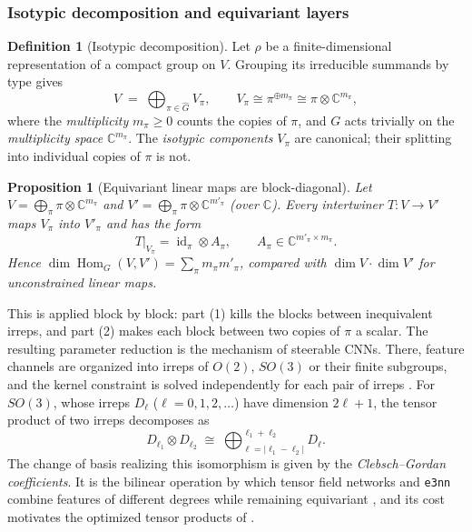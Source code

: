 \documentclass[11pt]{article}
\theoremstyle{plain}
\newtheorem{Proposition}{Proposition}[section]
\theoremstyle{definition}
\newtheorem{Definition}{Definition}[section]
\begin{document}
\subsubsection{Isotypic decomposition and equivariant layers}
\label{sec:isotypic-decomposition}

\begin{Definition}[Isotypic decomposition]\label{def:isotypic-decomposition}
Let $\rho$ be a finite-dimensional representation of a compact group on $V$.
Grouping its irreducible summands by type gives
\[
    V \;=\; \bigoplus_{\pi\in\widehat{G}} V_\pi, \qquad V_\pi\cong\pi^{\oplus m_\pi}\cong\pi\otimes\mathbb{C}^{m_\pi},
\]
where the \emph{multiplicity} $m_\pi\geq 0$ counts the copies of $\pi$, and $G$ acts trivially on the \emph{multiplicity space} $\mathbb{C}^{m_\pi}$.
The \emph{isotypic components} $V_\pi$ are canonical; their splitting into individual copies of $\pi$ is not.
\end{Definition}

\begin{Proposition}[Equivariant linear maps are block-diagonal]\label{prop:schur-blocks}
Let $V = \bigoplus_\pi\pi\otimes\mathbb{C}^{m_\pi}$ and $V' = \bigoplus_\pi\pi\otimes\mathbb{C}^{m'_\pi}$ (over $\mathbb{C}$).
Every intertwiner $T : V\to V'$ maps $V_\pi$ into $V'_\pi$ and has the form
\[
    T\big|_{V_\pi} = \operatorname{id}_\pi\otimes A_\pi, \qquad A_\pi\in\mathbb{C}^{m'_\pi\times m_\pi}.
\]
Hence $\dim\operatorname{Hom}_G(V,V') = \sum_\pi m_\pi m'_\pi$, compared with $\dim V\cdot\dim V'$ for unconstrained linear maps.
\end{Proposition}

This is  applied block by block: part (1) kills the blocks between inequivalent irreps, and part (2) makes each block between two copies of $\pi$ a scalar.
The resulting parameter reduction is the mechanism of steerable CNNs.
There, feature channels are organized into irreps of $O(2)$, $SO(3)$ or their finite subgroups, and the kernel constraint is solved independently for each pair of irreps \citep{weiler2018anips,weiler2019anips,cesa2021}.
For $SO(3)$, whose irreps $D_\ell$ ($\ell = 0,1,2,\dots$) have dimension $2\ell+1$, the tensor product of two irreps decomposes as
\[
    D_{\ell_1}\otimes D_{\ell_2}\;\cong\;\bigoplus_{\ell = |\ell_1-\ell_2|}^{\ell_1+\ell_2}D_\ell .
\]
The change of basis realizing this isomorphism is given by the \emph{Clebsch--Gordan coefficients}.
It is the bilinear operation by which tensor field networks and \texttt{e3nn} combine features of different degrees while remaining equivariant \citep{thomas2018,geiger2022}, and its cost motivates the optimized tensor products of .
\end{document}
